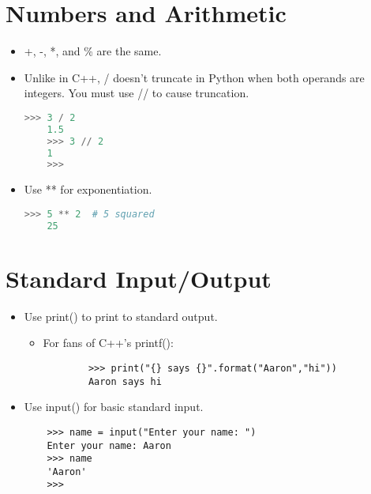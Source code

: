 \documentclass{article}
\begin{document}
\section{Numbers and Arithmetic}
\begin{itemize}
    \item +, -, *, and \% are the same.
    \item Unlike in C++, / doesn't truncate in Python when both operands are integers. You must use // to cause truncation.
    \begin{lstlisting}[language=Python]
    >>> 3 / 2
    1.5
    >>> 3 // 2
    1
    >>> 
    \end{lstlisting}
    \item Use ** for exponentiation.
    \begin{lstlisting}[language=Python]
    >>> 5 ** 2  # 5 squared
    25
    \end{lstlisting}

\end{itemize}

\section{Standard Input/Output}
\begin{itemize}
    \item Use print() to print to standard output.
        \begin{itemize}
        \item For fans of C++'s printf():
        \begin{lstlisting}
        >>> print("{} says {}".format("Aaron","hi"))
        Aaron says hi
        \end{lstlisting}
        \end{itemize}
    \item Use input() for basic standard input.
    \begin{lstlisting}
    >>> name = input("Enter your name: ")
    Enter your name: Aaron
    >>> name
    'Aaron'
    >>> 
    \end{lstlisting}
\end{itemize}
\end{document}
